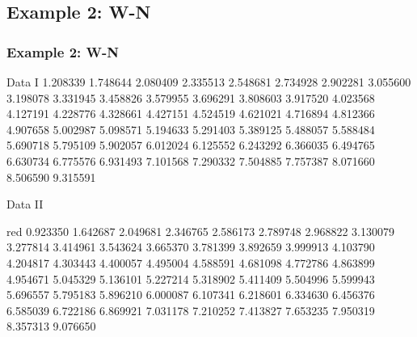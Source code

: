 \subsection{Example 2: W-N}
\begin{frame}
  \frametitle{Example 2: W-N}

\begin{footnotesize}
\begin{block}{Data I}
1.208339 1.748644 2.080409 2.335513 2.548681 2.734928 2.902281
3.055600 3.198078 3.331945 3.458826 3.579955 3.696291 3.808603
3.917520 4.023568 4.127191 4.228776 4.328661 4.427151 4.524519
4.621021 4.716894 4.812366 4.907658 5.002987 5.098571 5.194633
5.291403 5.389125 5.488057 5.588484 5.690718 5.795109 5.902057
6.012024 6.125552 6.243292 6.366035 6.494765 6.630734 6.775576
6.931493 7.101568 7.290332 7.504885 7.757387 8.071660 8.506590
9.315591
\end{block}

\begin{block}{Data II}
\begin{color}{red}
0.923350 1.642687 2.049681 2.346765 2.586173 2.789748 2.968822
3.130079 3.277814 3.414961 3.543624 3.665370 3.781399 3.892659
3.999913 4.103790 4.204817 4.303443 4.400057 4.495004 4.588591
4.681098 4.772786 4.863899 4.954671 5.045329 5.136101 5.227214
5.318902 5.411409 5.504996 5.599943 5.696557 5.795183 5.896210
6.000087 6.107341 6.218601 6.334630 6.456376 6.585039 6.722186
6.869921 7.031178 7.210252 7.413827 7.653235 7.950319 8.357313
9.076650
\end{color}
\end{block}
\end{footnotesize}
\end{frame}


